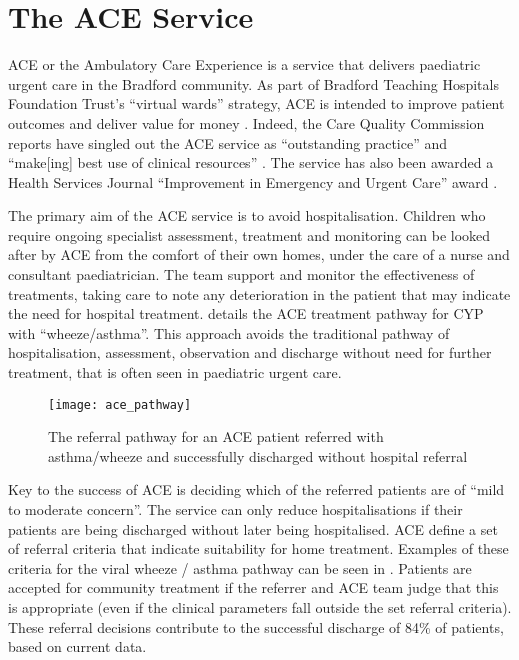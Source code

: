 \section{The ACE Service}\label{sec:the-ace-service}

ACE or the Ambulatory Care Experience is a service that delivers paediatric urgent care in the Bradford community.
As part of Bradford Teaching Hospitals Foundation Trust's ``virtual wards'' strategy, ACE is intended to improve patient outcomes and deliver value for money \cite{kingsfund}.
Indeed, the Care Quality Commission reports have singled out the ACE service as ``outstanding practice'' and ``make[ing] best use of clinical resources'' \cite{cqc}.
The service has also been awarded a Health Services Journal ``Improvement in Emergency and Urgent Care'' award \cite{hsj_award}.

The primary aim of the ACE service is to avoid hospitalisation.
Children who require ongoing specialist assessment, treatment and monitoring can be looked after by ACE from the comfort of their own homes, under the care of a nurse and consultant paediatrician.
The team support and monitor the effectiveness of treatments, taking care to note any deterioration in the patient that may indicate the need for hospital treatment.
 details the ACE treatment pathway for CYP with ``wheeze/asthma''.
This approach avoids the traditional pathway of hospitalisation, assessment, observation and discharge without need for further treatment, that is often seen in paediatric urgent care.

\begin{figure}[H]
    \centering
    \texttt{[image: ace\_pathway]}
    \caption[ACE asthma/wheeze referral pathway]{The referral pathway for an ACE patient referred with asthma/wheeze and successfully discharged without hospital referral}
    \label{fig:ace-pathway}
\end{figure}

Key to the success of ACE is deciding which of the referred patients are of ``mild to moderate concern''.
The service can only reduce hospitalisations if their patients are being discharged without later being hospitalised.
ACE define a set of referral criteria that indicate suitability for home treatment.
Examples of these criteria for the viral wheeze / asthma pathway can be seen in .
Patients are accepted for community treatment if the referrer and ACE team judge that this is appropriate (even if the clinical parameters fall outside the set referral criteria).
These referral decisions contribute to the successful discharge of 84\% of patients, based on current data.

